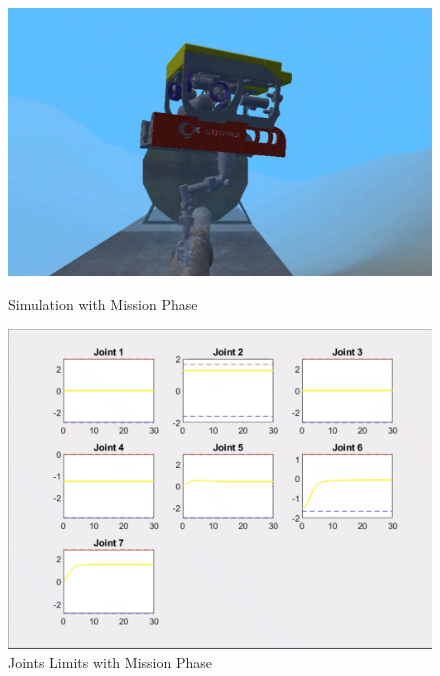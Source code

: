 \documentclass{article}
\begin{document}
\begin{figure}[htpb] 
\begin{minipage}{0.40\textwidth}  
\includegraphics[width=\textwidth]{513_uncomment.png}
\caption{Simulation with Mission Phase}\label{513_nh1} 
\end{minipage}  
\hspace{0.2\textwidth} 
\begin{minipage}{0.40\textwidth}  
\includegraphics[width=\textwidth]{513_jointlimits.png}
\caption{Joints Limits with Mission Phase}\label{513_h1} 
\end{minipage} 
\hspace{0.2\textwidth} 
\begin{minipage}{0.40\textwidth}  

\end{minipage}
\end{figure}
\end{document}

